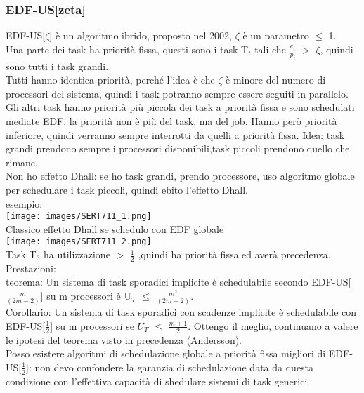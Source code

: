 \documentclass[18px]{article}
\begin{document}
\subsubsection{EDF-US[zeta]}
EDF-US[$\zeta$] è un algoritmo ibrido, proposto nel 2002, $\zeta$ è un parametro $\leq$ 1.\\ Una parte dei task ha priorità fissa, questi sono i task T$_t$ tali che $\frac{e_i}{p_i}$ $>$ $\zeta$, quindi sono tutti i task grandi.\\ Tutti hanno identica priorità, perché l'idea è che $\zeta$ è minore del numero di processori del sistema, quindi i task potranno sempre essere seguiti in parallelo.\\ Gli altri task hanno priorità più piccola dei task a priorità fissa e sono schedulati mediate EDF: la priorità non è più del task, ma del job. Hanno però priorità inferiore, quindi verranno sempre interrotti da quelli a priorità fissa. Idea: task grandi prendono sempre i processori disponibili,task piccoli prendono quello che rimane.\\ Non ho effetto Dhall: se ho task grandi, prendo processore, uso algoritmo globale per schedulare i task piccoli, quindi ebito l'effetto Dhall.\\ esempio:\\
\texttt{[image: images/SERT711\_1.png]}\\
Classico effetto Dhall se schedulo con EDF globale\\
\texttt{[image: images/SERT711\_2.png]}\\ Task T$_3$ ha utilizzazione $>$ $\frac{1}{2}$ ,quindi ha priorità fissa ed averà precedenza.\\ Prestazioni:\\ teorema: Un sistema di task sporadici implicite è  schedulabile secondo EDF-US[$\frac{m}{(2m-2)}$] su m processori è U$_T$ $\leq$ $\frac{m^2}{(2m-2)}$.\\ Corollario: Un sistema di task sporadici con scadenze implicite è schedulabile con EDF-US[$\frac{1}{2}$] su m processori se $U_T$ $\leq$ $\frac{m + 1}{2}$. Ottengo il meglio, continuano a valere le ipotesi del teorema visto in precedenza (Andersson).\\ Posso esistere algoritmi di schedulazione globale a priorità fissa migliori di EDF-US[$\frac{1}{2}$]: non devo confondere la garanzia di schedulazione data da questa condizione con l'effettiva capacità di shedulare sistemi di task generici
\end{document}
